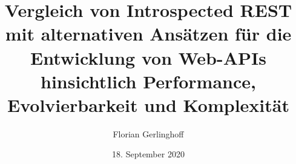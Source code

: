 \documentclass[
  a4paper,
  ngerman,
  fontsize=12pt,
  cleardoublepage=empty,
  listof=notnumbered,
  bibliography=notnumbered,
  headsepline,
  headings=normal,
  draft=false,
  BCOR=9mm
]{scrbook}
\author{Florian Gerlinghoff}
\title{Vergleich von Introspected REST mit alternativen Ansätzen für die Entwicklung von Web-APIs hinsichtlich Performance, Evolvierbarkeit und Komplexität}
\date{18. September 2020}
\theoremstyle{microtypedefstyle}
\begin{document}

\cleardoubleemptypage{}


\tableofcontents{}









\printbibliography{}

\appendix



\end{document}
